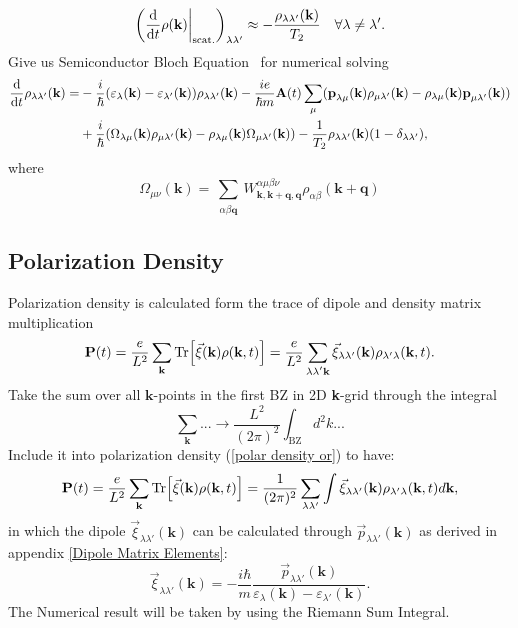 \documentclass[12pt,english,a4paper]{article}
\begin{document}
\begin{equation}
	\bigg(\dv{ }{t} \rho(\textbf{k})\bigg|_{\mathrm{scat.}}\bigg)_{\lambda \lambda'} \approx -\frac{\rho_{\lambda \lambda'}(\textbf{k})}{T_2}\quad \forall \lambda \neq \lambda'. 
\end{equation}
Give us Semiconductor Bloch Equation~\cite{haug_quantum_2009} for numerical solving
\begin{align}
	\label{SBE}
	\dv{ }{t}\rho_{\lambda\lambda'}(\textbf{k}) = &- \frac{i}{\hbar} (\varepsilon_\lambda(\textbf{k}) - \varepsilon_{\lambda'} (\textbf{k}))\rho_{\lambda \lambda'}(\textbf{k}) - \frac{ie}{\hbar m} \textbf{A}(t)\sum_{\mu}(\textbf{p}_{\lambda\mu}(\textbf{k})\rho_{\mu \lambda'}(\textbf{k}) - \rho_{\lambda\mu}(\textbf{k})\textbf{p}_{\mu \lambda'}(\textbf{k})) \nonumber \\
	&+ \frac{i}{\hbar}(\Omega_{\lambda \mu}(\textbf{k})\rho_{\mu \lambda'}(\textbf{k}) - \rho_{\lambda\mu}(\textbf{k}) \Omega_{\mu \lambda'} (\textbf{k})) -\frac{1}{T_2}\rho_{\lambda\lambda'}(\textbf{k})(1-\delta_{\lambda\lambda'}),
\end{align}
\quad where
\begin{equation}
	\Omega_{\mu\nu} (\textbf{k})=\sum_{\substack{\alpha\beta \textbf{q}}} W^{\alpha \mu \beta \nu}_{\textbf{k},\textbf{k}+\textbf{q},\textbf{q}} \rho_{\alpha\beta} (\textbf{k}+\textbf{q})
\end{equation}
\subsection{Polarization Density}
\quad Polarization density is calculated form the trace of dipole and density matrix multiplication
\begin{equation}
\label{polar density or}
\textbf{P}(t) = \frac{e}{L^2} \sum_{\textbf{k}}\Tr[\vec{\xi}(\textbf{k})\rho(\textbf{k},t)] = \frac{e}{L^2}\sum_{\substack{\lambda \lambda'\textbf{k}}} \vec{\xi}_{\lambda \lambda' }(\textbf{k})\rho_{\lambda' \lambda}(\textbf{k},t).
\end{equation}
\quad Take the sum over all $\textbf{k}$-points in the first BZ in 2D \textbf{k}-grid through the integral
\begin{equation}
\sum_{\textbf{k}}... \to \frac{L^2}{(2\pi)^2}\int_{\mathrm{BZ}} d^2 k...
\end{equation}
\quad Include it into polarization density (\ref{polar density or}) to have:
\begin{equation}
	\label{polar}
\textbf{P}(t) = \frac{e}{L^2} \sum_{\textbf{k}} \Tr[\vec{\xi} (\textbf{k}) \rho(\textbf{k},t)] = \frac{1}{(2\pi)^2} \sum_{\lambda\lambda'}	\int \vec{\xi}_{\lambda \lambda'} (\textbf{k}) \rho_{\lambda'\lambda}(\textbf{k},t)d\textbf{k},
\end{equation}
in which the dipole $\vec{\xi}_{\lambda \lambda'}(\textbf{k})$ can be calculated through $\vec{p}_{\lambda \lambda'}(\textbf{k})$ as derived in appendix \ref{Dipole Matrix Elements}:
\begin{equation}
	\vec{\xi}_{\lambda \lambda'} (\textbf{k}) = -\frac{i\hbar }{m} \frac{\vec{p}_{\lambda \lambda'}(\textbf{k})}{\varepsilon_{\lambda}(\textbf{k}) - \varepsilon_{\lambda'}(\textbf{k})}.
\end{equation}
\quad The Numerical result will be taken by using the Riemann Sum Integral.
\newpage
\end{document}
